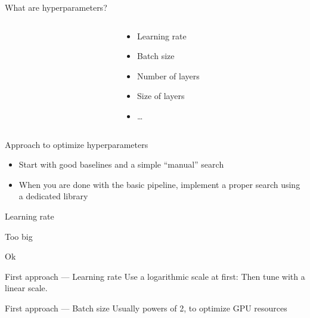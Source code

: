\begin{frame}{What are hyperparameters?}
  \begin{columns}
    \begin{column}[c]{0.5\textwidth}
    \end{column}
    \begin{column}[c]{0.5\textwidth}
      \begin{itemize}
        \item Learning rate
        \item Batch size
        \item Number of layers
        \item Size of layers
        \item …
      \end{itemize}
    \end{column}
  \end{columns}
\end{frame}

\begin{frame}{Approach to optimize hyperparameters}
  \begin{itemize}[<+->]
    \item Start with good baselines and a simple “manual” search
    \item When you are done with the basic pipeline, implement a proper search using a dedicated library
  \end{itemize}
\end{frame}

\begin{frame}{Learning rate}
  \begin{minipage}{0.49\textwidth}
    \centering
    Too big
  \end{minipage}\hfill
  \begin{minipage}{0.49\linewidth}
    \centering
    Ok
  \end{minipage}\hfill

\end{frame}

\begin{frame}{First approach --- Learning rate}
  Use a logarithmic scale at first:
  Then tune with a linear scale.
\end{frame}

\begin{frame}{First approach --- Batch size}
  Usually powers of 2, to optimize GPU resources
\end{frame}

